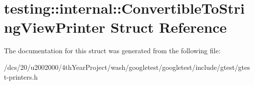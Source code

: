 \hypertarget{structtesting_1_1internal_1_1ConvertibleToStringViewPrinter}{}\section{testing\+:\+:internal\+:\+:Convertible\+To\+String\+View\+Printer Struct Reference}
\label{structtesting_1_1internal_1_1ConvertibleToStringViewPrinter}


The documentation for this struct was generated from the following file\+:\begin{DoxyCompactItemize}
\item 
/dcs/20/u2002000/4th\+Year\+Project/wash/googletest/googletest/include/gtest/gtest-\/printers.\+h\end{DoxyCompactItemize}
